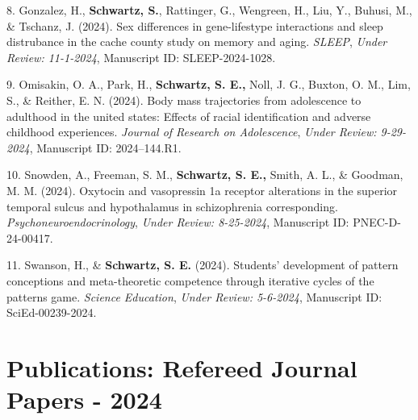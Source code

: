 \documentclass[11pt,a4paper,]{moderncv}
\newlength{\cslhangindent}
\newenvironment{CSLReferences}[2] %
 {\begin{list}{}{%
  \setlength{\itemindent}{0pt}
  \setlength{\leftmargin}{0pt}
  \setlength{\parsep}{0pt}
  \ifodd #1
   \setlength{\leftmargin}{\cslhangindent}
   \setlength{\itemindent}{-1\cslhangindent}
  \fi
  \setlength{\itemsep}{#2\baselineskip}}}
 {\end{list}}
\begin{document}
\begin{CSLReferences}{1}{0}
8. Gonzalez, H., \textbf{Schwartz, S.}, Rattinger, G., Wengreen, H.,
Liu, Y., Buhusi, M., \& Tschanz, J. (2024). Sex differences in
gene-lifestype interactions and sleep distrubance in the cache county
study on memory and aging. \emph{SLEEP}, \emph{Under Review: 11-1-2024},
Manuscript ID: SLEEP-2024-1028.

9. Omisakin, O. A., Park, H., \textbf{Schwartz, S. E.,} Noll, J. G.,
Buxton, O. M., Lim, S., \& Reither, E. N. (2024). Body mass trajectories
from adolescence to adulthood in the united states: Effects of racial
identification and adverse childhood experiences. \emph{Journal of
Research on Adolescence}, \emph{Under Review: 9-29-2024}, Manuscript ID:
2024--144.R1.

10. Snowden, A., Freeman, S. M., \textbf{Schwartz, S. E.,} Smith, A. L.,
\& Goodman, M. M. (2024). Oxytocin and vasopressin 1a receptor
alterations in the superior temporal sulcus and hypothalamus in
schizophrenia corresponding. \emph{Psychoneuroendocrinology},
\emph{Under Review: 8-25-2024}, Manuscript ID: PNEC-D-24-00417.

11. Swanson, H., \& \textbf{Schwartz, S. E.} (2024). Students'
development of pattern conceptions and meta-theoretic competence through
iterative cycles of the patterns game. \emph{Science Education},
\emph{Under Review: 5-6-2024}, Manuscript ID: SciEd-00239-2024.

\end{CSLReferences}

\endgroup

\clearpage

\section{Publications: Refereed Journal Papers -
2024}\label{publications-refereed-journal-papers---2024}

\begingroup
\setlength{\parindent}{-0.5in}
\setlength{\leftskip}{0.5in}
\end{document}

